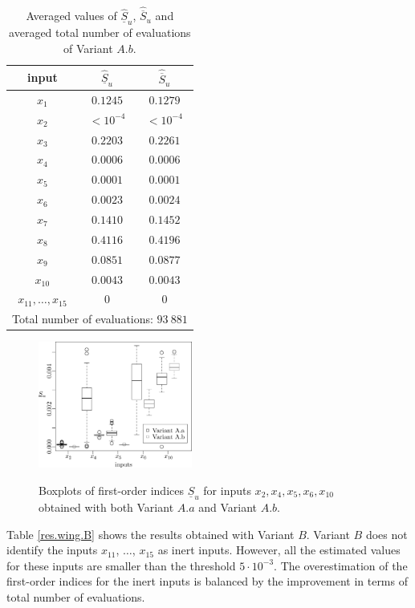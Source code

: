 \begin{table}[t]
\caption{Averaged values of $\widehat{\underline{S}}_u$, ${\widehat{\overline{S}}_u}$ and averaged total number of evaluations of Variant $A.b$.}
 \centering
\begin{tabular}{ccc}
\hline
  input & $\widehat{\underline{S}}_u$ & $\widehat{\overline{S}}_u$ \\ \hline
 $x_1$ & $0.1245$ & $0.1279$  \\ \hline
 $x_2$ & $< 10^{-4}$ & $< 10^{-4}$  \\ \hline
 $x_3$ & $0.2203$ & $0.2261$  \\ \hline
 $x_4$ & $0.0006$ & $0.0006$  \\ \hline
 $x_5$ & $0.0001$ & $0.0001$  \\ \hline
 $x_6$ & $0.0023$ & $0.0024$  \\ \hline 
 $x_7$ & $0.1410$ & $0.1452$  \\ \hline
 $x_8$ & $0.4116$ & $0.4196$  \\ \hline
 $x_9$ & $0.0851$ & $0.0877$  \\ \hline
 $x_{10}$ & $0.0043$ & $0.0043$  \\ \hline
 $x_{11},\dots,x_{15}$ & $0$ & $0$  \\ \hline
\hline
\multicolumn{3}{l}{Total number of evaluations: $93 \ 881$} \\ \hline 
\end{tabular}
\label{res.wing.Ab}
\end{table}

\begin{figure}[t]
\caption{Boxplots of first-order indices $\underline{S}_u$ for inputs $x_2,x_4,x_5,x_6,x_{10}$ obtained with both Variant $A.a$ and Variant $A.b$.}
\vspace*{0.2cm}
\centering
\includegraphics[width=0.45\textwidth]{Fig4.eps}
\label{boxplots.wing}
\end{figure}

Table \ref{res.wing.B} shows the results obtained with Variant $B$. Variant $B$ does not identify the inputs $x_{11}$, $\dots$, $x_{15}$ as inert inputs. However, all the estimated values for these inputs are smaller than the threshold $5\cdot 10^{-3}$. The overestimation of the first-order indices for the inert inputs is balanced by the improvement in terms of total number of evaluations.

